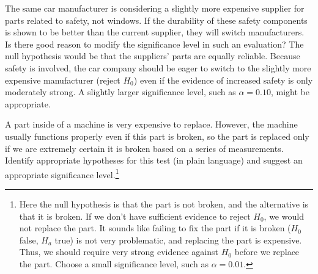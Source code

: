 \begin{example}{The same car manufacturer is considering a slightly more expensive supplier for parts related to safety, not windows. If the durability of these safety components is shown to be better than the current supplier, they will switch manufacturers. Is there good reason to modify the significance level in such an evaluation?}
The null hypothesis would be that the suppliers' parts are equally reliable. Because safety is involved, the car company should be eager to switch to the slightly more expensive manufacturer (reject $H_0$) even if the evidence of increased safety is only moderately strong. A slightly larger significance level, such as $\alpha=0.10$, might be appropriate.
\end{example}

\begin{exercise}
A part inside of a machine is very expensive to replace. However, the machine usually functions properly even if this part is broken, so the part is replaced only if we are extremely certain it is broken based on a series of measurements. Identify appropriate hypotheses for this test (in plain language) and suggest an appropriate significance level.\footnote{Here the null hypothesis is that the part is not broken, and the alternative is that it is broken. If we don't have sufficient evidence to reject $H_0$, we would not replace the part. It sounds like failing to fix the part if it is broken ($H_0$ false, $H_a$ true) is not very problematic, and replacing the part is expensive. Thus, we should require very strong evidence against $H_0$ before we replace the part. Choose a small significance level, such as $\alpha=0.01$.}
\end{exercise}

